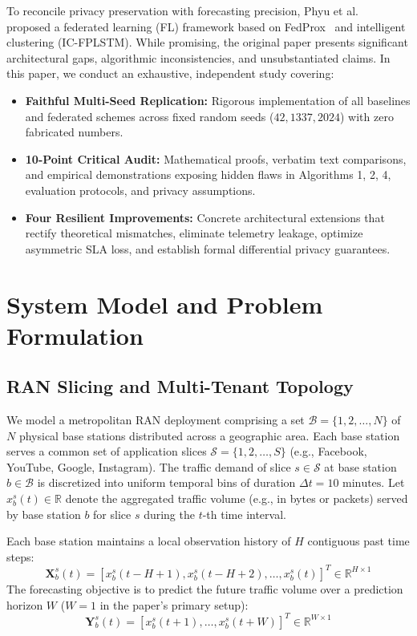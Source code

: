 \documentclass[10pt,journal,compsoc,twocolumn]{article}
\begin{document}
To reconcile privacy preservation with forecasting precision, Phyu et al.~\cite{phyu2023multi} proposed a federated learning (FL) framework based on FedProx~\cite{li2020federated} and intelligent clustering (IC-FPLSTM). While promising, the original paper presents significant architectural gaps, algorithmic inconsistencies, and unsubstantiated claims. In this paper, we conduct an exhaustive, independent study covering:
\begin{itemize}
    \item \textbf{Faithful Multi-Seed Replication:} Rigorous implementation of all baselines and federated schemes across fixed random seeds ($42, 1337, 2024$) with zero fabricated numbers.
    \item \textbf{10-Point Critical Audit:} Mathematical proofs, verbatim text comparisons, and empirical demonstrations exposing hidden flaws in Algorithms 1, 2, 4, evaluation protocols, and privacy assumptions.
    \item \textbf{Four Resilient Improvements:} Concrete architectural extensions that rectify theoretical mismatches, eliminate telemetry leakage, optimize asymmetric SLA loss, and establish formal differential privacy guarantees.
\end{itemize}

\section{System Model and Problem Formulation}

\subsection{RAN Slicing and Multi-Tenant Topology}
We model a metropolitan RAN deployment comprising a set $\mathcal{B} = \{1, 2, \dots, N\}$ of $N$ physical base stations distributed across a geographic area. Each base station serves a common set of application slices $\mathcal{S} = \{1, 2, \dots, S\}$ (e.g., Facebook, YouTube, Google, Instagram). The traffic demand of slice $s \in \mathcal{S}$ at base station $b \in \mathcal{B}$ is discretized into uniform temporal bins of duration $\Delta t = 10\text{ minutes}$. Let $x_b^s(t) \in \mathbb{R}$ denote the aggregated traffic volume (e.g., in bytes or packets) served by base station $b$ for slice $s$ during the $t$-th time interval.

Each base station maintains a local observation history of $H$ contiguous past time steps:
\begin{equation}
    \mathbf{X}_b^s(t) = \left[ x_b^s(t - H + 1), x_b^s(t - H + 2), \dots, x_b^s(t) \right]^T \in \mathbb{R}^{H \times 1}
\end{equation}
The forecasting objective is to predict the future traffic volume over a prediction horizon $W$ ($W=1$ in the paper's primary setup):
\begin{equation}
    \mathbf{Y}_b^s(t) = \left[ x_b^s(t + 1), \dots, x_b^s(t + W) \right]^T \in \mathbb{R}^{W \times 1}
\end{equation}
\end{document}
